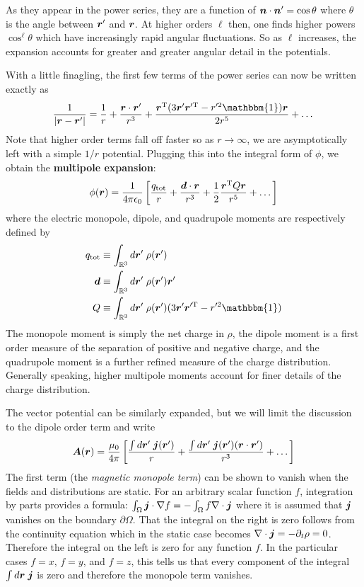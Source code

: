 \documentclass[twocolumn]{gwclass}
\newcommand{\R}{\mathbb{R}}
\begin{document}
	As they appear in the power series, they are a function of $\boldsymbol{n}\cdot\boldsymbol{n}'=\cos\theta$ where $\theta$ is the angle between $\boldsymbol{r}'$ and $\boldsymbol{r}$. At higher orders $\ell$ then, one finds higher powers $\cos^\ell\theta$ which have increasingly rapid angular fluctuations. So as $\ell$ increases, the expansion accounts for greater and greater angular detail in the potentials.
	
	With a little finagling, the first few terms of the power series can now be written exactly as
	$$ \frac{1}{|\*r-\*r'|} = \frac{1}{r} + \frac{\*r\cdot\*r'}{r^3} + \frac{\*r^\t{T}(3\*r'\*r'^{\t{T}} - r'^2\mathbbm{1})\*r}{2r^5} + \dots $$
	Note that higher order terms fall off faster so as $r\to\infty$, we are asymptotically left with a simple $1/r$ potential. Plugging this into the integral form of $\phi$, we obtain the \textbf{multipole expansion}:
	$$ \phi(\boldsymbol{r}) = \frac{1}{4\pi\epsilon_0}\left[ \frac{q_{\text{\normalfont{tot}}}}{r} + \frac{\boldsymbol{d}\cdot\boldsymbol{r}}{r^3} + \frac{1}{2}\frac{\boldsymbol{r}^{\text{\normalfont{T}}}Q\boldsymbol{r}}{r^5} + \dots \right] $$
	where the electric monopole, dipole, and quadrupole moments are respectively defined by
	\begin{align*}
		q_\t{tot} &\equiv \int_{\R^3} d\*r'\;\rho(\*r') \\
		\*d &\equiv \int_{\R^3} d\*r'\;\rho(\*r')\*r' \\
		Q &\equiv \int_{\R^3} d\*r'\;\rho(\*r')(3\*r'\*r'^{\t{T}} - r'^2\mathbbm{1})
	\end{align*}
	The monopole moment is simply the net charge in $\rho$, the dipole moment is a first order measure of the separation of positive and negative charge, and the quadrupole moment is a further refined measure of the charge distribution. Generally speaking, higher multipole moments account for finer details of the charge distribution.
	
	The vector potential can be similarly expanded, but we will limit the discussion to the dipole order term and write
	$$ \boldsymbol{A}(\boldsymbol{r})=\frac{\mu_0}{4\pi}\left[ \frac{\int d\boldsymbol{r}'\;\boldsymbol{j}(\boldsymbol{r}')}{r} + \frac{\int d\boldsymbol{r}'\;\boldsymbol{j}(\boldsymbol{r}')(\boldsymbol{r}\cdot\boldsymbol{r}')}{r^3} + \dots \right] $$
	The first term (the \emph{magnetic monopole term}) can be shown to vanish when the fields and distributions are static. For an arbitrary scalar function $f$, integration by parts provides a formula: $ \int_\Omega \boldsymbol{j}\cdot\nabla f = - \int_{\Omega}f\nabla\cdot\boldsymbol{j} $
	where it is assumed that $\boldsymbol{j}$ vanishes on the boundary $\partial\Omega$. That the integral on the right is zero follows from the continuity equation which in the static case becomes $\nabla\cdot\boldsymbol{j}=-\partial_t\rho=0$. Therefore the integral on the left is zero for any function $f$. In the particular cases $f=x$, $f=y$, and $f=z$, this tells us that every component of the integral $\int d\boldsymbol{r}\;\boldsymbol{j}$ is zero and therefore the monopole term vanishes.
	
\end{document}
